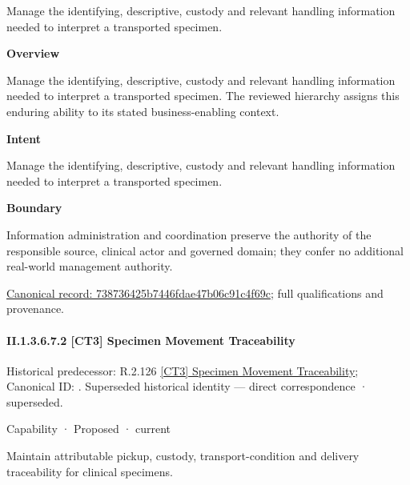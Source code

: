 Manage the identifying, descriptive, custody and relevant handling information needed to interpret a transported specimen.



\textbf{Overview}



Manage the identifying, descriptive, custody and relevant handling information needed to interpret a transported specimen. The reviewed hierarchy assigns this enduring ability to its stated business-enabling context.



\textbf{Intent}



Manage the identifying, descriptive, custody and relevant handling information needed to interpret a transported specimen.



\textbf{Boundary}



Information administration and coordination preserve the authority of the responsible source, clinical actor and governed domain; they confer no additional real-world management authority.


{\footnotesize \href{../../../../../../../continuum/strategy/capability/738736425b7446fdae47b06c91c4f69c.md}{Canonical record: 738736425b7446fdae47b06c91c4f69c}; full qualifications and provenance.}\par
\paragraph*{II.1.3.6.7.2 [CT3] Specimen Movement Traceability}
\label{navigation:II.1.3.6.7.2}

{\small Historical predecessor: R.2.126 \hyperref[element:129119d7b2744ffd805c58f25557fa27]{[CT3] Specimen Movement Traceability}; Canonical ID: \texttt{}. Superseded historical identity — direct correspondence · superseded.}\par
\label{element:bfa2e9a84ddd4287897573dc0d917a00}
{\small Capability · Proposed · current}\par

Maintain attributable pickup, custody, transport-condition and delivery traceability for clinical specimens.



